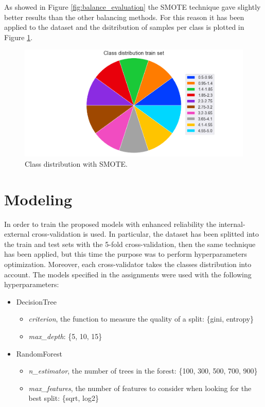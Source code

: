 \documentclass[../main]{subfiles}
\begin{document}
As showed in Figure \ref{fig:balance_evaluation} the SMOTE technique gave slightly better results than the other balancing methods.
For this reason it has been applied to the dataset and the dsitribution of samples per class is plotted in Figure \ref{fig:class_distribuition_balance}.
\begin{figure}[h]
    \begin{center}
        \includegraphics[width=0.6\linewidth]{figures/class_distribution_smote.png}
    \end{center}
    
    \caption{Class distribution  with SMOTE.}
    \label{fig:class_distribuition_balance}
\end{figure}
\newpage

\section{Modeling}
In order to train the proposed models with enhanced reliability the internal-external cross-validation is used.
In particular, the dataset has been splitted into the train and test sets with the 5-fold cross-validation, then the same technique has been applied, but this time the purpose was to perform hyperparameters optimization.
Moreover, each cross-validator takes the classes distribution into account.
The models specified in the assignments were used with the following hyperparameters:
\begin{itemize}
    \item DecisionTree
    \begin{itemize}
        \item \textit{criterion}, the function to measure the quality of a split: \{gini, entropy\}
        \item \textit{max\_depth}: \{5, 10, 15\}
    \end{itemize}
    \item RandomForest
    \begin{itemize}
        \item \textit{n\_estimator}, the number of trees in the forest: \{100, 300, 500, 700, 900\}
        \item \textit{max\_features}, the number of features to consider when looking for the best split: \{sqrt, log2\}
    \end{itemize} 
\end{itemize}
\end{document}
